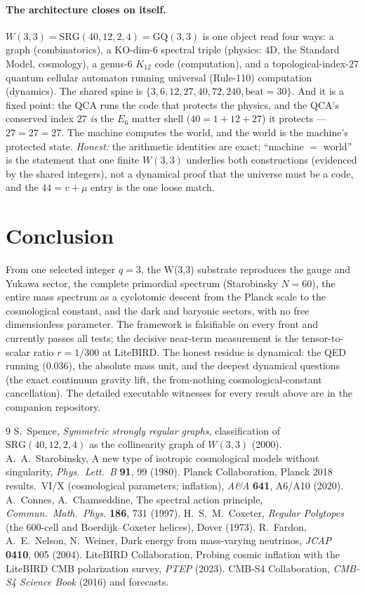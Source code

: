 \documentclass[11pt]{article}
\begin{document}
\paragraph{The architecture closes on itself.} $W(3,3)=\mathrm{SRG}(40,12,2,4)=\mathrm{GQ}(3,3)$
is one object read four ways: a graph (combinatorics), a KO-dim-$6$ spectral triple (physics: 4D,
the Standard Model, cosmology), a genus-$6$ $K_{12}$ code (computation), and a topological-index-$27$
quantum cellular automaton running universal (Rule-110) computation (dynamics). The shared spine is
$\{3,6,12,27,40,72,240,\mathrm{beat}{=}30\}$. And it is a fixed point: the QCA runs the code that
protects the physics, and the QCA's conserved index $27$ \emph{is} the $E_6$ matter shell
($40=1+12+27$) it protects --- $27=27=27$. The machine computes the world, and the world is the
machine's protected state. \emph{Honest:} the arithmetic identities are exact; ``machine $=$
world'' is the statement that one finite $W(3,3)$ underlies both constructions (evidenced by the
shared integers), not a dynamical proof that the universe must be a code, and the $44=v+\mu$ entry
is the one loose match.

\section{Conclusion}
From one selected integer $q=3$, the W(3,3) substrate reproduces the gauge and Yukawa sector,
the complete primordial spectrum (Starobinsky $N=60$), the entire mass spectrum as a cyclotomic
descent from the Planck scale to the cosmological constant, and the dark and baryonic sectors,
with no free dimensionless parameter. The framework is falsifiable on every front and currently
passes all tests; the decisive near-term measurement is the tensor-to-scalar ratio $r=1/300$ at
LiteBIRD. The honest residue is dynamical: the QED running ($0.036$), the absolute mass unit,
and the deepest dynamical questions (the exact continuum gravity lift, the from-nothing
cosmological-constant cancellation). The detailed executable witnesses for every result above
are in the companion repository.

\begin{thebibliography}{9}
 S.~Spence, \emph{Symmetric strongly regular graphs}, classification of
$\mathrm{SRG}(40,12,2,4)$ as the collinearity graph of $W(3,3)$ (2000).
 A.~A.~Starobinsky, A new type of isotropic cosmological models without
singularity, \emph{Phys.\ Lett.\ B} \textbf{91}, 99 (1980).
 Planck Collaboration, Planck 2018 results.\ VI/X (cosmological parameters;
inflation), \emph{A\&A} \textbf{641}, A6/A10 (2020).
 A.~Connes, A.~Chamseddine, The spectral action principle, \emph{Commun.\
Math.\ Phys.} \textbf{186}, 731 (1997).
 H.~S.~M.~Coxeter, \emph{Regular Polytopes} (the $600$-cell and
Boerdijk--Coxeter helices), Dover (1973).
 R.~Fardon, A.~E.~Nelson, N.~Weiner, Dark energy from mass-varying neutrinos,
\emph{JCAP} \textbf{0410}, 005 (2004).
 LiteBIRD Collaboration, Probing cosmic inflation with the LiteBIRD CMB
polarization survey, \emph{PTEP} (2023).
 CMB-S4 Collaboration, \emph{CMB-S4 Science Book} (2016) and forecasts.
\end{thebibliography}
\end{document}
